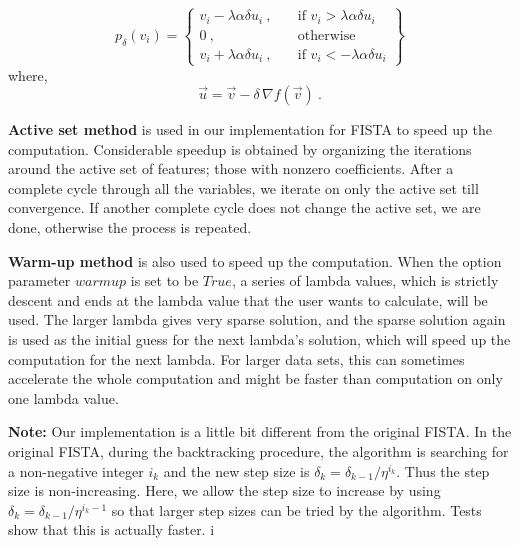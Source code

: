 \begin{equation}
p_\delta (v_i) = \left\{ \begin{array}{ll}
v_i - \lambda\alpha\delta u_i\ , \quad  & \mbox{if } v_i > \lambda\alpha\delta
u_i \\
0\ , \quad & \mbox{otherwise} \\
v_i + \lambda\alpha\delta u_i\ , \quad & \mbox{if } v_i < - \lambda\alpha\delta u_i
\end{array}
\right\}
\end{equation}
where,
\begin{equation}
\vec{u} = \vec{v} - \delta\,\nabla f(\vec{v})\ .
\end{equation}

{\bf Active set method} is used in our implementation for FISTA to
speed up the computation. Considerable speedup is obtained by
organizing the iterations around the active set of features; those
with nonzero coefficients. After a complete cycle through all the
variables, we iterate on only the active set till convergence. If
another complete cycle does not change the active set, we are done,
otherwise the process is repeated.

{\bf Warm-up method} is also used to speed up the computation. When
the option parameter $warmup$ is set to be $True$, a series of lambda
values, which is strictly descent and ends at the lambda value that
the user wants to calculate, will be used. The larger lambda gives
very sparse solution, and the sparse solution again is used as the
initial guess for the next lambda's solution, which will speed up the
computation for the next lambda. For larger data sets, this can
sometimes accelerate the whole computation and might be faster than
computation on only one lambda value.

{\bf Note:} Our implementation is a little bit different from the
original FISTA. In the original FISTA, during the backtracking
procedure, the algorithm is searching for a non-negative integer $i_k$
and the new step size is $\delta_k = \delta_{k-1}/\eta^{i_k}$. Thus
the step size is non-increasing. Here, we allow the step size to
increase by using $\delta_k = \delta_{k-1}/\eta^{i_k-1}$ so that
larger step sizes can be tried by the algorithm. Tests show that this
is actually faster.
i

